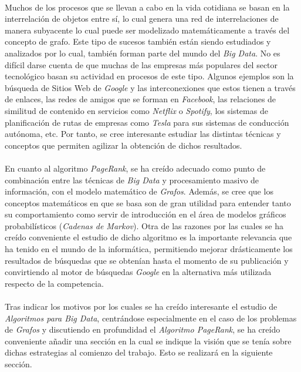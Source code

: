 \documentclass{subfiles}
\begin{document}
      \paragraph{}
      Muchos de los procesos que se llevan a cabo en la vida cotidiana se basan en la interrelación de objetos entre sí, lo cual genera una red de interrelaciones de manera subyacente lo cual puede ser modelizado matemáticamente a través del concepto de grafo. Este tipo de sucesos también están siendo estudiados y analizados por lo cual, también forman parte del mundo del \emph{Big Data}. No es difícil darse cuenta de que muchas de las empresas más populares del sector tecnológico basan su actividad en procesos de este tipo. Algunos ejemplos son la búsqueda de Sitios Web de \emph{Google} y las interconexiones que estos tienen a través de enlaces, las redes de amigos que se forman en \emph{Facebook}, las relaciones de similitud de contenido en servicios como \emph{Netflix} o \emph{Spotify}, los sistemas de planificación de rutas de empresas como \emph{Tesla} para sus sistemas de conducción autónoma, etc. Por tanto, se cree interesante estudiar las distintas técnicas y conceptos que permiten agilizar la obtención de dichos resultados.

      \paragraph{}
      En cuanto al algoritmo \emph{PageRank}, se ha creído adecuado como punto de combinación entre las técnicas de \emph{Big Data} y procesamiento masivo de información, con el modelo matemático de \emph{Grafos}. Además, se cree que los conceptos matemáticos en que se basa son de gran utilidad para entender tanto su comportamiento como servir de introducción en el área de modelos gráficos probabilísticos (\emph{Cadenas de Markov}). Otra de las razones por las cuales se ha creído conveniente el estudio de dicho algoritmo es la importante relevancia que ha tenido en el mundo de la informática, permitiendo mejorar drásticamente los resultados de búsquedas que se obtenían hasta el momento de su publicación y convirtiendo al motor de búsquedas \emph{Google} en la alternativa más utilizada respecto de la competencia.

      \paragraph{}
      Tras indicar los motivos por los cuales se ha creído interesante el estudio de \emph{Algoritmos para Big Data}, centrándose especialmente en el caso de los problemas de \emph{Grafos} y discutiendo en profundidad el \emph{Algoritmo PageRank}, se ha creído conveniente añadir una sección en la cual se indique la visión que se tenía sobre dichas estrategias al comienzo del trabajo. Esto se realizará en la siguiente sección.
\end{document}

